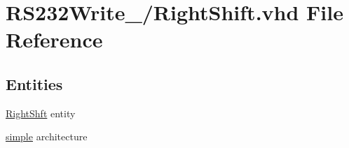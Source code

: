 \hypertarget{16_2_right_shift_8vhd}{}\section{R\+S232\+Write\+\_/\+Right\+Shift.vhd File Reference}
\label{16_2_right_shift_8vhd}
\subsection*{Entities}
\begin{DoxyCompactItemize}
\item 
\hyperlink{class_right_shft}{Right\+Shft} entity
\item 
\hyperlink{class_right_shft_1_1simple}{simple} architecture
\end{DoxyCompactItemize}
